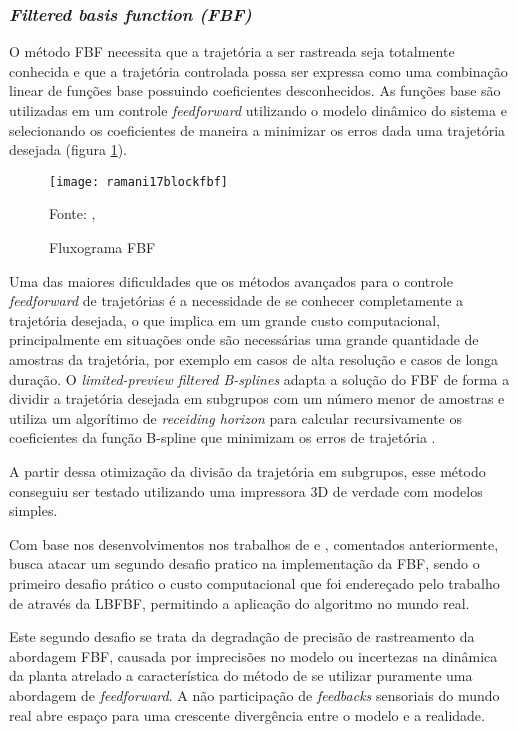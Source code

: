 \subsubsection{\textit{Filtered basis function (FBF)}}
O método FBF necessita que a trajetória a ser rastreada seja totalmente
conhecida e que a trajetória controlada possa ser expressa como
uma combinação linear de funções base possuindo coeficientes desconhecidos.
As funções base são utilizadas em um controle \textit{feedforward} utilizando
o modelo dinâmico do sistema e selecionando os coeficientes de maneira a
minimizar os erros dada uma trajetória desejada (figura \ref{fig:flowchart_fbf}).
\cite{ramani17}

\begin{figure}[H]
    \centering
    \caption{Fluxograma FBF}
    \texttt{[image: ramani17blockfbf]}

    {\footnotesize Fonte: \citeauthor{ramani17}, \citeyear{ramani17}}
    \label{fig:flowchart_fbf}
\end{figure}

Uma das maiores dificuldades que os métodos avançados para o
controle \textit{feedforward} de trajetórias é a necessidade de se conhecer
completamente a trajetória desejada, o que implica em um grande custo
computacional, principalmente em situações onde são necessárias uma
grande quantidade de amostras da trajetória, por exemplo em casos de alta resolução
e casos de longa duração.
O \textit{limited-preview filtered B-splines} adapta a solução do FBF de forma a dividir a 
trajetória desejada em subgrupos com um número menor de amostras e utiliza um algorítimo de 
\textit{receiding horizon} para calcular recursivamente os coeficientes da função B-spline que 
minimizam os erros de trajetória \cite{duan18}.

A partir dessa otimização da divisão da trajetória em subgrupos, esse método
conseguiu ser testado utilizando uma impressora 3D de verdade com modelos simples.

Com base nos desenvolvimentos nos trabalhos de \cite{ramani17} e \cite{duan18}, comentados anteriormente, 
\cite{ramani20} busca atacar um segundo desafio pratico na implementação da FBF, sendo o primeiro desafio prático
o custo computacional que foi endereçado pelo trabalho de \cite{duan18} através da LBFBF, permitindo a aplicação
do algoritmo no mundo real.

Este segundo desafio se trata da degradação de precisão de rastreamento da abordagem FBF, causada por
imprecisões no modelo ou incertezas na dinâmica da planta atrelado a característica do método de se
utilizar puramente uma abordagem de \textit{feedforward}. A não participação de \textit{feedbacks} sensoriais
do mundo real abre espaço para uma crescente divergência entre o modelo e a realidade.

